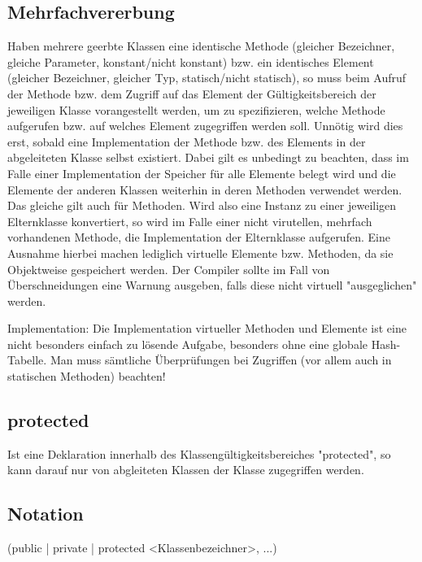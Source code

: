 \subsection{Mehrfachvererbung}
Haben mehrere geerbte Klassen eine identische Methode (gleicher Bezeichner, gleiche Parameter, konstant/nicht konstant) bzw. ein
identisches Element (gleicher Bezeichner, gleicher Typ, statisch/nicht statisch), so
muss beim Aufruf der Methode bzw. dem Zugriff auf das Element der Gültigkeitsbereich der jeweiligen Klasse vorangestellt werden,
um zu spezifizieren, welche Methode aufgerufen bzw. auf welches Element zugegriffen werden soll.
Unnötig wird dies erst, sobald eine Implementation der Methode bzw. des Elements in der abgeleiteten Klasse selbst existiert.
Dabei gilt es unbedingt zu beachten, dass im Falle einer Implementation der Speicher für alle Elemente belegt wird und
die Elemente der anderen Klassen weiterhin in deren Methoden verwendet werden. Das gleiche gilt auch für Methoden.
Wird also eine Instanz zu einer jeweiligen Elternklasse konvertiert, so wird im Falle einer nicht virutellen, mehrfach
vorhandenen Methode, die Implementation der Elternklasse aufgerufen.
Eine Ausnahme hierbei machen lediglich virtuelle Elemente bzw. Methoden, da sie Objektweise gespeichert werden.
Der Compiler sollte im Fall von Überschneidungen eine Warnung ausgeben, falls diese nicht virtuell "ausgeglichen" werden.

Implementation:
Die Implementation virtueller Methoden und Elemente ist eine nicht besonders einfach zu lösende Aufgabe, besonders ohne eine
globale Hash-Tabelle. Man muss sämtliche Überprüfungen bei Zugriffen (vor allem auch in statischen Methoden) beachten!

\subsection{protected}
Ist eine Deklaration innerhalb des Klassengültigkeitsbereiches "protected", so kann darauf nur von abgleiteten Klassen
der Klasse zugegriffen werden.

\subsection{Notation}
(public | private | protected <Klassenbezeichner>, ...)


